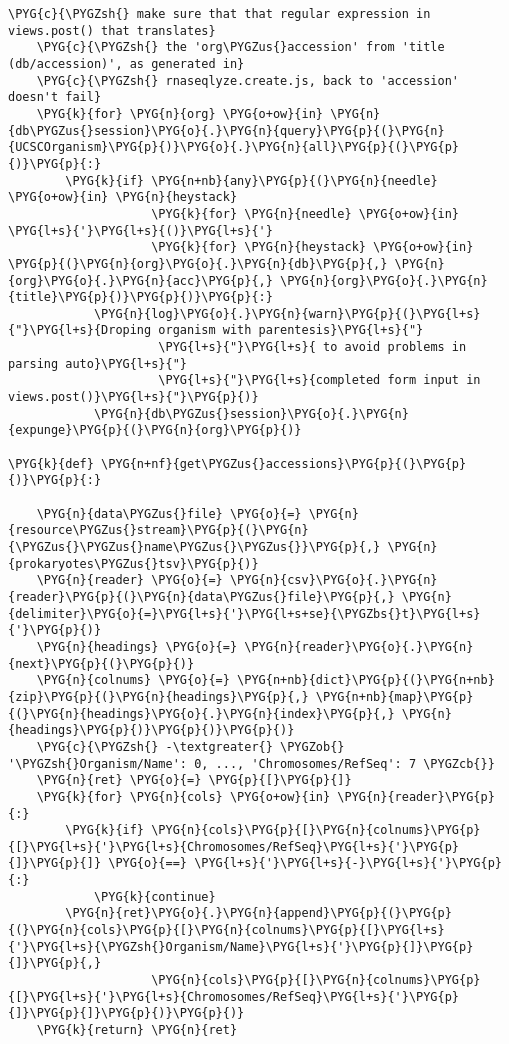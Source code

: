 \begin{Verbatim}[commandchars=\\\{\}]
    \PYG{c}{\PYGZsh{} make sure that that regular expression in views.post() that translates}
    \PYG{c}{\PYGZsh{} the 'org\PYGZus{}accession' from 'title (db/accession)', as generated in}
    \PYG{c}{\PYGZsh{} rnaseqlyze.create.js, back to 'accession' doesn't fail}
    \PYG{k}{for} \PYG{n}{org} \PYG{o+ow}{in} \PYG{n}{db\PYGZus{}session}\PYG{o}{.}\PYG{n}{query}\PYG{p}{(}\PYG{n}{UCSCOrganism}\PYG{p}{)}\PYG{o}{.}\PYG{n}{all}\PYG{p}{(}\PYG{p}{)}\PYG{p}{:}
        \PYG{k}{if} \PYG{n+nb}{any}\PYG{p}{(}\PYG{n}{needle} \PYG{o+ow}{in} \PYG{n}{heystack}
                    \PYG{k}{for} \PYG{n}{needle} \PYG{o+ow}{in} \PYG{l+s}{'}\PYG{l+s}{()}\PYG{l+s}{'}
                    \PYG{k}{for} \PYG{n}{heystack} \PYG{o+ow}{in} \PYG{p}{(}\PYG{n}{org}\PYG{o}{.}\PYG{n}{db}\PYG{p}{,} \PYG{n}{org}\PYG{o}{.}\PYG{n}{acc}\PYG{p}{,} \PYG{n}{org}\PYG{o}{.}\PYG{n}{title}\PYG{p}{)}\PYG{p}{)}\PYG{p}{:}
            \PYG{n}{log}\PYG{o}{.}\PYG{n}{warn}\PYG{p}{(}\PYG{l+s}{"}\PYG{l+s}{Droping organism with parentesis}\PYG{l+s}{"}
                     \PYG{l+s}{"}\PYG{l+s}{ to avoid problems in parsing auto}\PYG{l+s}{"}
                     \PYG{l+s}{"}\PYG{l+s}{completed form input in views.post()}\PYG{l+s}{"}\PYG{p}{)}
            \PYG{n}{db\PYGZus{}session}\PYG{o}{.}\PYG{n}{expunge}\PYG{p}{(}\PYG{n}{org}\PYG{p}{)}

\PYG{k}{def} \PYG{n+nf}{get\PYGZus{}accessions}\PYG{p}{(}\PYG{p}{)}\PYG{p}{:}

    \PYG{n}{data\PYGZus{}file} \PYG{o}{=} \PYG{n}{resource\PYGZus{}stream}\PYG{p}{(}\PYG{n}{\PYGZus{}\PYGZus{}name\PYGZus{}\PYGZus{}}\PYG{p}{,} \PYG{n}{prokaryotes\PYGZus{}tsv}\PYG{p}{)}
    \PYG{n}{reader} \PYG{o}{=} \PYG{n}{csv}\PYG{o}{.}\PYG{n}{reader}\PYG{p}{(}\PYG{n}{data\PYGZus{}file}\PYG{p}{,} \PYG{n}{delimiter}\PYG{o}{=}\PYG{l+s}{'}\PYG{l+s+se}{\PYGZbs{}t}\PYG{l+s}{'}\PYG{p}{)}
    \PYG{n}{headings} \PYG{o}{=} \PYG{n}{reader}\PYG{o}{.}\PYG{n}{next}\PYG{p}{(}\PYG{p}{)}
    \PYG{n}{colnums} \PYG{o}{=} \PYG{n+nb}{dict}\PYG{p}{(}\PYG{n+nb}{zip}\PYG{p}{(}\PYG{n}{headings}\PYG{p}{,} \PYG{n+nb}{map}\PYG{p}{(}\PYG{n}{headings}\PYG{o}{.}\PYG{n}{index}\PYG{p}{,} \PYG{n}{headings}\PYG{p}{)}\PYG{p}{)}\PYG{p}{)}
    \PYG{c}{\PYGZsh{} -\textgreater{} \PYGZob{} '\PYGZsh{}Organism/Name': 0, ..., 'Chromosomes/RefSeq': 7 \PYGZcb{}}
    \PYG{n}{ret} \PYG{o}{=} \PYG{p}{[}\PYG{p}{]}
    \PYG{k}{for} \PYG{n}{cols} \PYG{o+ow}{in} \PYG{n}{reader}\PYG{p}{:}
        \PYG{k}{if} \PYG{n}{cols}\PYG{p}{[}\PYG{n}{colnums}\PYG{p}{[}\PYG{l+s}{'}\PYG{l+s}{Chromosomes/RefSeq}\PYG{l+s}{'}\PYG{p}{]}\PYG{p}{]} \PYG{o}{==} \PYG{l+s}{'}\PYG{l+s}{-}\PYG{l+s}{'}\PYG{p}{:}
            \PYG{k}{continue}
        \PYG{n}{ret}\PYG{o}{.}\PYG{n}{append}\PYG{p}{(}\PYG{p}{(}\PYG{n}{cols}\PYG{p}{[}\PYG{n}{colnums}\PYG{p}{[}\PYG{l+s}{'}\PYG{l+s}{\PYGZsh{}Organism/Name}\PYG{l+s}{'}\PYG{p}{]}\PYG{p}{]}\PYG{p}{,}
                    \PYG{n}{cols}\PYG{p}{[}\PYG{n}{colnums}\PYG{p}{[}\PYG{l+s}{'}\PYG{l+s}{Chromosomes/RefSeq}\PYG{l+s}{'}\PYG{p}{]}\PYG{p}{]}\PYG{p}{)}\PYG{p}{)}
    \PYG{k}{return} \PYG{n}{ret}
\end{Verbatim}


